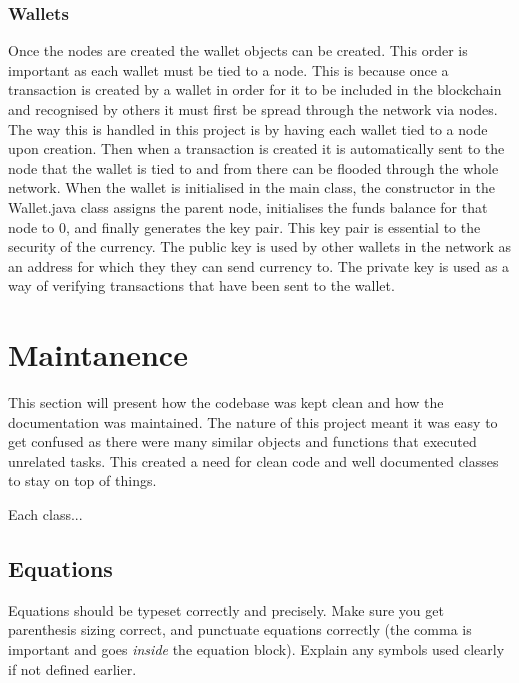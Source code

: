 \documentclass{l4proj}
\begin{document}
\subsubsection{Wallets}
Once the nodes are created the wallet objects can be created. This order is important as each wallet must be tied to
a node. This is because once a transaction is created by a wallet in order for it to be included in the blockchain
and recognised by others it must first be spread through the network via nodes. The way this is handled in this 
project is by having each wallet tied to a node upon creation. Then when a transaction is created it is automatically
sent to the node that the wallet is tied to and from there can be flooded through the whole network. When the wallet
is initialised in the main class, the constructor in the Wallet.java class assigns the parent node, initialises the
funds balance for that node to 0, and finally generates the key pair. This key pair is essential to the security 
of the currency. The public key is used by other wallets in the network as an address for which they they can send
currency to. The private key is used as a way of verifying transactions that have been sent to the wallet.



\section{Maintanence}
This section will present how the codebase was kept clean and how the documentation was maintained. The nature of
this project meant it was easy to get confused as there were many similar objects and functions that executed 
unrelated tasks. This created a need for clean code and well documented classes to stay on top of things.

Each class...


\clearpage

\subsection{Equations}

Equations should be typeset correctly and precisely. Make sure you get parenthesis sizing correct, and punctuate equations correctly 
(the comma is important and goes \textit{inside} the equation block). Explain any symbols used clearly if not defined earlier. 
\end{document}
